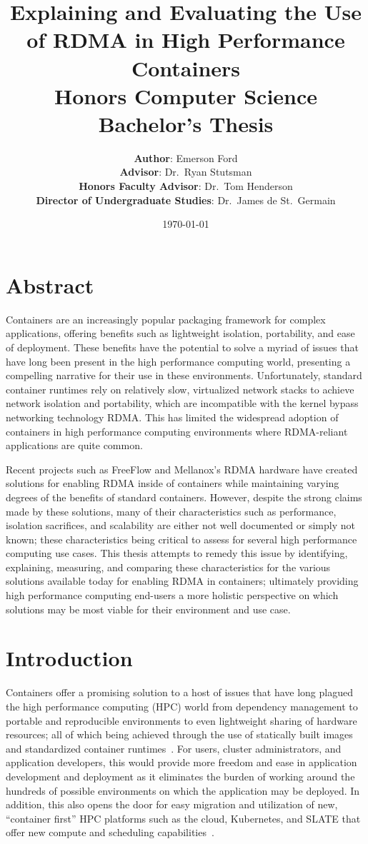 \documentclass[12pt,titlepage]{article}
\title{\Large\textbf{Explaining and Evaluating the Use of RDMA in High Performance Containers} \\
Honors Computer Science Bachelor's Thesis}
\author{\textbf{Author}: Emerson Ford \\
\textbf{Advisor}: Dr.\ Ryan Stutsman \\
\textbf{Honors Faculty Advisor}: Dr.\ Tom Henderson \\
\textbf{Director of Undergraduate Studies}: Dr.\ James de St.\ Germain }
\date{\today}
\begin{document}
\maketitle


\section*{Abstract}
Containers are an increasingly popular packaging framework for complex applications, offering benefits such as lightweight isolation, portability, and ease of deployment.
These benefits have the potential to solve a myriad of issues that have long been present in the high performance computing world, presenting a compelling narrative for their use in these environments.
Unfortunately, standard container runtimes rely on relatively slow, virtualized network stacks to achieve network isolation and portability, which are incompatible with the kernel bypass networking technology RDMA\@.
This has limited the widespread adoption of containers in high performance computing environments where RDMA-reliant applications are quite common.

Recent projects such as FreeFlow and Mellanox's RDMA hardware have created solutions for enabling RDMA inside of containers while maintaining varying degrees of the benefits of standard containers.
However, despite the strong claims made by these solutions, many of their characteristics such as performance, isolation sacrifices, and scalability are either not well documented or simply not known; these characteristics being critical to assess for several high performance computing use cases.
This thesis attempts to remedy this issue by identifying, explaining, measuring, and comparing these characteristics for the various solutions available today for enabling RDMA in containers;
ultimately providing high performance computing end-users a more holistic perspective on which solutions may be most viable for their environment and use case.

\section{Introduction}
Containers offer a promising solution to a host of issues that have long plagued the high performance computing (HPC) world from dependency management to portable and reproducible environments to even lightweight sharing of hardware resources;
all of which being achieved through the use of statically built images and standardized container runtimes~\cite{containershpc}.
For users, cluster administrators, and application developers, this would provide more freedom and ease in application development and deployment as it eliminates the burden of working around the hundreds of possible environments on which the application may be deployed.
In addition, this also opens the door for easy migration and utilization of new, ``container first'' HPC platforms such as the cloud, Kubernetes, and SLATE that offer new compute and scheduling capabilities~\cite{slatepaper}.
\end{document}

